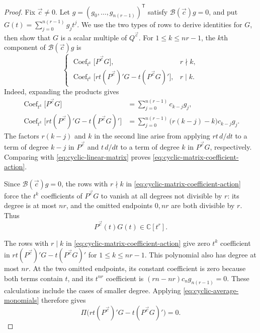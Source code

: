 \documentclass[12pt,reqno,a4paper]{amsart}
\numberwithin{equation}{section}
\numberwithin{figure}{section}
\theoremstyle{plain}
\theoremstyle{definition}
\DeclareMathOperator{\Coef}{Coef}
\begin{document}
\begin{proof}
Fix $\vec c\ne0$. Let $g=(g_0,\ldots,g_{n(r-1)})^{\mathsf T}$ satisfy
$\mathcal B(\vec c)g=0$, and put
$G(t)=\sum_{j=0}^{n(r-1)}g_jt^j$.
We use the two types of rows to derive identities for $G$, then
show that $G$ is a scalar multiple of $Q^{\vec c}$.
For $1\leq k\leq nr-1$,
the $k$th component of $\mathcal B(\vec c)g$ is
\begin{equation}\label{eq:cyclic-matrix-coefficient-action}
 \begin{cases}
 \Coef_{t^k}\bigl[P^{\vec c}G\bigr],&r\nmid k,\\
 \Coef_{t^k}\bigl[rt(P^{\vec c})'G-t(P^{\vec c}G)'\bigr],&r\mid k.
 \end{cases}
\end{equation}
Indeed, expanding the products gives
\[
 \begin{aligned}
 \Coef_{t^k}\bigl[P^{\vec c}G\bigr]
 &=\sum_{j=0}^{n(r-1)}c_{k-j}g_j,\\
 \Coef_{t^k}\bigl[rt(P^{\vec c})'G-t(P^{\vec c}G)'\bigr]
 &=\sum_{j=0}^{n(r-1)}\bigl(r(k-j)-k\bigr)c_{k-j}g_j.
 \end{aligned}
\]
The factors $r(k-j)$ and $k$ in the second line arise from applying
$rt\,d/dt$ to a term of degree $k-j$ in $P^{\vec c}$ and
$t\,d/dt$ to a term of degree $k$ in $P^{\vec c}G$, respectively.
Comparing with \eqref{eq:cyclic-linear-matrix}
proves \eqref{eq:cyclic-matrix-coefficient-action}.

Since $\mathcal B(\vec c)g=0$, the rows with $r\nmid k$ in
\eqref{eq:cyclic-matrix-coefficient-action} force the $t^k$
coefficients of $P^{\vec c}G$ to vanish at all degrees not divisible
by $r$: its degree is at most $nr$, and the omitted endpoints
$0,nr$ are both divisible by $r$. Thus
\begin{equation}\label{eq:cyclic-kernel-invariant-product}
 P^{\vec c}(t)G(t)\in\mathbb C[t^r].
\end{equation}

The rows with $r\mid k$ in \eqref{eq:cyclic-matrix-coefficient-action}
give zero $t^k$ coefficient in $rt(P^{\vec c})'G-t(P^{\vec c}G)'$
for $1\leq k\leq nr-1$. This polynomial also has degree at most
$nr$. At the two omitted endpoints, its constant coefficient is
zero because both terms contain $t$, and its $t^{nr}$ coefficient
is $(rn-nr)c_ng_{n(r-1)}=0$. These calculations include the cases
of smaller degree. Applying \eqref{eq:cyclic-average-monomials}
therefore gives
\begin{equation}\label{eq:cyclic-kernel-average}
 \Pi\bigl(rt(P^{\vec c})'G-t(P^{\vec c}G)'\bigr)=0.
\end{equation}


\end{proof}
\end{document}
